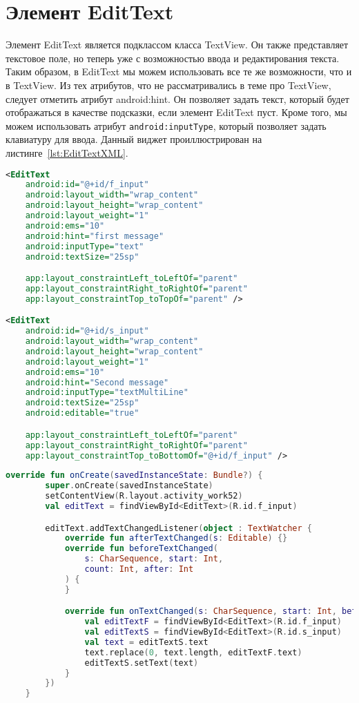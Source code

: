 \section{Элемент EditText}
Элемент EditText является подклассом класса TextView. Он также 
представляет текстовое поле, но теперь уже с возможностью ввода и 
редактирования текста. Таким образом, в EditText мы можем использовать 
все те же возможности, что и в TextView. Из тех атрибутов, что не 
рассматривались в теме про TextView, следует отметить атрибут android:hint. 
Он позволяет задать текст, который будет отображаться в качестве 
подсказки, если элемент EditText пуст. Кроме того, мы можем использовать 
атрибут \texttt{android:inputType}, который позволяет задать
клавиатуру для ввода.
Данный виджет проиллюстрирован на листинге~\ref{lst:EditTextXML}.
\begin{lstlisting}[language=xml, caption=\leftline{EditTextXML}, label=lst:EditTextXML]
<EditText
	android:id="@+id/f_input"
	android:layout_width="wrap_content"
	android:layout_height="wrap_content"
	android:layout_weight="1"
	android:ems="10"
	android:hint="first message"
	android:inputType="text"
	android:textSize="25sp"

	app:layout_constraintLeft_toLeftOf="parent"
	app:layout_constraintRight_toRightOf="parent"
	app:layout_constraintTop_toTopOf="parent" />

<EditText
	android:id="@+id/s_input"
	android:layout_width="wrap_content"
	android:layout_height="wrap_content"
	android:layout_weight="1"
	android:ems="10"
	android:hint="Second message"
	android:inputType="textMultiLine"
	android:textSize="25sp"
	android:editable="true"

	app:layout_constraintLeft_toLeftOf="parent"
	app:layout_constraintRight_toRightOf="parent"
	app:layout_constraintTop_toBottomOf="@+id/f_input" />
\end{lstlisting}
\begin{lstlisting}[language=Kotlin, caption=\leftline{EditTextKotlin}, label=lst:EditTextKotlin]
override fun onCreate(savedInstanceState: Bundle?) {
        super.onCreate(savedInstanceState)
        setContentView(R.layout.activity_work52)
        val editText = findViewById<EditText>(R.id.f_input)

        editText.addTextChangedListener(object : TextWatcher {
            override fun afterTextChanged(s: Editable) {}
            override fun beforeTextChanged(
                s: CharSequence, start: Int,
                count: Int, after: Int
            ) {
            }

            override fun onTextChanged(s: CharSequence, start: Int, before: Int, count: Int) {
                val editTextF = findViewById<EditText>(R.id.f_input)
                val editTextS = findViewById<EditText>(R.id.s_input)
                val text = editTextS.text
                text.replace(0, text.length, editTextF.text)
                editTextS.setText(text)
            }
        })
    }
\end{lstlisting}


